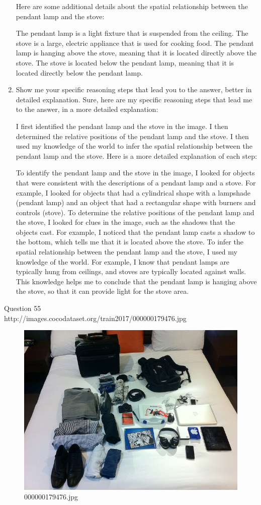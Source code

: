 \begin{enumerate}
    Here are some additional details about the spatial relationship between the pendant lamp and the stove:
    
    The pendant lamp is a light fixture that is suspended from the ceiling.
    The stove is a large, electric appliance that is used for cooking food.
    The pendant lamp is hanging above the stove, meaning that it is located directly above the stove.
    The stove is located below the pendant lamp, meaning that it is located directly below the pendant lamp.
    \item Show me your specific reasoning steps that lead you to the answer, better in detailed explanation.
    \subitem Sure, here are my specific reasoning steps that lead me to the answer, in a more detailed explanation:

    I first identified the pendant lamp and the stove in the image.
    I then determined the relative positions of the pendant lamp and the stove.
    I then used my knowledge of the world to infer the spatial relationship between the pendant lamp and the stove.
    Here is a more detailed explanation of each step:
    
    To identify the pendant lamp and the stove in the image, I looked for objects that were consistent with the descriptions of a pendant lamp and a stove. For example, I looked for objects that had a cylindrical shape with a lampshade (pendant lamp) and an object that had a rectangular shape with burners and controls (stove).
    To determine the relative positions of the pendant lamp and the stove, I looked for clues in the image, such as the shadows that the objects cast. For example, I noticed that the pendant lamp casts a shadow to the bottom, which tells me that it is located above the stove.
    To infer the spatial relationship between the pendant lamp and the stove, I used my knowledge of the world. For example, I know that pendant lamps are typically hung from ceilings, and stoves are typically located against walls. This knowledge helps me to conclude that the pendant lamp is hanging above the stove, so that it can provide light for the stove area.
\end{enumerate}
Question 55\\
http://images.cocodataset.org/train2017/000000179476.jpg
\begin{figure}[h]
    \centering
    \includegraphics[width=0.8\linewidth]{../image set/hard/000000179476.jpg}
    \caption{000000179476.jpg}
\end{figure}
